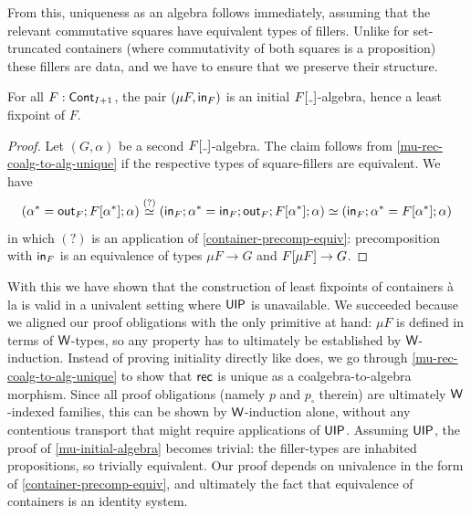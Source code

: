 From this, uniqueness as an algebra follows immediately,
assuming that the relevant commutative squares have equivalent types of fillers.
Unlike for set-truncated containers (where commutativity of both squares is a proposition)
these fillers are data, and we have to ensure that we preserve their structure.
\begin{theorem}\label{mu-initial-algebra}
  For all \( F : \operatorname{\mathsf{Cont}}_{I + 1}\), the pair \( (\mu F, \operatorname{\mathsf{in}}_F) \) is an initial \( \Subst{F}{\Blank} \)-algebra,
  hence a least fixpoint of \( F \).
  \begin{proof}
    Let \( (G, \alpha) \) be a second \( \Subst{F}{\Blank} \)-algebra.
    The claim follows from \autoref{mu-rec-coalg-to-alg-unique} if the respective types of square-fillers are equivalent.
    We have
    \[
      (\alpha^* = \operatorname{\mathsf{out}}_F ; F\lbrack\alpha^*\rbrack ; \alpha)
        \overset{(?)}{\simeq}
      (\operatorname{\mathsf{in}}_F ; \alpha^* = \operatorname{\mathsf{in}}_F ; \operatorname{\mathsf{out}}_F ; F\lbrack\alpha^*\rbrack ; \alpha)
        \simeq
      (\operatorname{\mathsf{in}}_F ; \alpha^* = F\lbrack\alpha^*\rbrack ; \alpha)
    \]
    in which \( (?) \) is an application of \autoref{container-precomp-equiv}:
    precomposition with \( \operatorname{\mathsf{in}}_F \) is an equivalence of types
    \( \mu F \to G \) and \( F\lbrack\mu F\rbrack \to G \).
  \end{proof}
\end{theorem}

With this we have shown that the construction of least fixpoints of containers
{\`a} la \cite{AltenkirchEtAl2015Indexedcontainers} is valid in a univalent setting where \( \mathsf{UIP} \) is unavailable.
We succeeded because we aligned our proof obligations with the only primitive at hand:
\( \mu F \) is defined in terms of \( \W \)-types,
so any property has to ultimately be established by \( \W \)-induction.
Instead of proving initiality directly like \cite[Proposition~5.2]{AltenkirchEtAl2015Indexedcontainers} does,
we go through \autoref{mu-rec-coalg-to-alg-unique} to show that \( \operatorname{\mathsf{rec}} \) is unique as a coalgebra-to-algebra morphism.
Since all proof obligations (namely \( p \) and \( p_\square \) therein) are ultimately \( \W \)-indexed families,
this can be shown by \( \W \)-induction alone,
without any contentious transport that might require applications of \( \mathsf{UIP} \).
Assuming \( \mathsf{UIP} \), the proof of \autoref{mu-initial-algebra} becomes trivial:
the filler-types are inhabited propositions, so trivially equivalent.
Our proof depends on univalence in the form of \autoref{container-precomp-equiv},
and ultimately the fact that equivalence of containers is an identity system.

